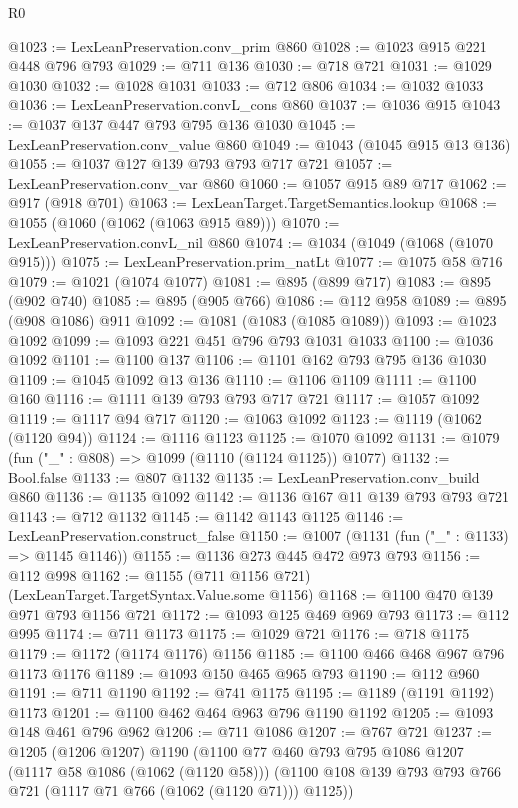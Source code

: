 \begin{lexlean}{R0}
\begin{coremodule}
@1023 := LexLeanPreservation.conv_prim @860
@1028 := @1023 @915 @221 @448 @796 @793
@1029 := @711 @136
@1030 := @718 @721
@1031 := @1029 @1030
@1032 := @1028 @1031
@1033 := @712 @806
@1034 := @1032 @1033
@1036 := LexLeanPreservation.convL_cons @860
@1037 := @1036 @915
@1043 := @1037 @137 @447 @793 @795 @136 @1030
@1045 := LexLeanPreservation.conv_value @860
@1049 := @1043 (@1045 @915 @13 @136)
@1055 := @1037 @127 @139 @793 @793 @717 @721
@1057 := LexLeanPreservation.conv_var @860
@1060 := @1057 @915 @89 @717
@1062 := @917 (@918 @701)
@1063 := LexLeanTarget.TargetSemantics.lookup
@1068 := @1055 (@1060 (@1062 (@1063 @915 @89)))
@1070 := LexLeanPreservation.convL_nil @860
@1074 := @1034 (@1049 (@1068 (@1070 @915)))
@1075 := LexLeanPreservation.prim_natLt
@1077 := @1075 @58 @716
@1079 := @1021 (@1074 @1077)
@1081 := @895 (@899 @717)
@1083 := @895 (@902 @740)
@1085 := @895 (@905 @766)
@1086 := @112 @958
@1089 := @895 (@908 @1086) @911
@1092 := @1081 (@1083 (@1085 @1089))
@1093 := @1023 @1092
@1099 := @1093 @221 @451 @796 @793 @1031 @1033
@1100 := @1036 @1092
@1101 := @1100 @137
@1106 := @1101 @162 @793 @795 @136 @1030
@1109 := @1045 @1092 @13 @136
@1110 := @1106 @1109
@1111 := @1100 @160
@1116 := @1111 @139 @793 @793 @717 @721
@1117 := @1057 @1092
@1119 := @1117 @94 @717
@1120 := @1063 @1092
@1123 := @1119 (@1062 (@1120 @94))
@1124 := @1116 @1123
@1125 := @1070 @1092
@1131 := @1079 (fun ("_" : @808) => @1099 (@1110 (@1124 @1125)) @1077)
@1132 := Bool.false
@1133 := @807 @1132
@1135 := LexLeanPreservation.conv_build @860
@1136 := @1135 @1092
@1142 := @1136 @167 @11 @139 @793 @793 @721
@1143 := @712 @1132
@1145 := @1142 @1143 @1125
@1146 := LexLeanPreservation.construct_false
@1150 := @1007 (@1131 (fun ("_" : @1133) => @1145 @1146))
@1155 := @1136 @273 @445 @472 @973 @793
@1156 := @112 @998
@1162 := @1155 (@711 @1156 @721) (LexLeanTarget.TargetSyntax.Value.some @1156)
@1168 := @1100 @470 @139 @971 @793 @1156 @721
@1172 := @1093 @125 @469 @969 @793
@1173 := @112 @995
@1174 := @711 @1173
@1175 := @1029 @721
@1176 := @718 @1175
@1179 := @1172 (@1174 @1176) @1156
@1185 := @1100 @466 @468 @967 @796 @1173 @1176
@1189 := @1093 @150 @465 @965 @793
@1190 := @112 @960
@1191 := @711 @1190
@1192 := @741 @1175
@1195 := @1189 (@1191 @1192) @1173
@1201 := @1100 @462 @464 @963 @796 @1190 @1192
@1205 := @1093 @148 @461 @796 @962
@1206 := @711 @1086
@1207 := @767 @721
@1237 := @1205
    (@1206 @1207)
    @1190
    (@1100
      @77
      @460
      @793
      @795
      @1086
      @1207
      (@1117 @58 @1086 (@1062 (@1120 @58)))
      (@1100 @108 @139 @793 @793 @766 @721 (@1117 @71 @766 (@1062 (@1120 @71))) @1125))

\end{coremodule}
\end{lexlean}
